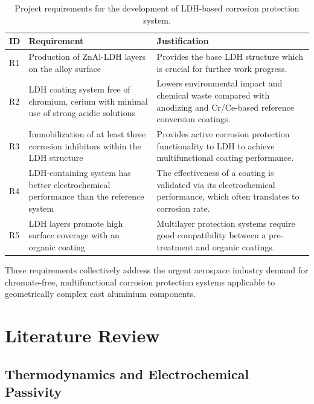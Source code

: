 \documentclass[11pt,twoside,a4paper,final]{report}
\begin{document}
\begin{table}[htbp]
    \centering
    \small
    \caption{Project requirements for the development of LDH-based corrosion protection system.}
    \label{tab:project_requirements}
    \begin{tabular}{@{} >{\raggedright\arraybackslash}p{} >{\raggedright\arraybackslash}p{} >{\raggedright\arraybackslash}p{} @{}}
        \toprule
        \textbf{ID} & \textbf{Requirement} & \textbf{Justification} \\
        \midrule
        R1 & Production of ZnAl-LDH layers on the alloy surface & Provides the base LDH structure which is crucial for further work progress. \\
        \addlinespace
        R2 & LDH coating system free of chromium, cerium with minimal use of strong acidic solutions & Lowers environmental impact and chemical waste compared with anodizing and Cr/Ce-based reference conversion coatings. \\
        \addlinespace
        R3 & Immobilization of at least three corrosion inhibitors within the LDH structure & Provides active corrosion protection functionality to LDH to achieve multifunctional coating performance. \\
        \addlinespace
        R4 & LDH-containing system has better electrochemical performance than the reference system & The effectiveness of a coating is validated via its electrochemical performance, which often translates to corrosion rate. \\
        \addlinespace
        R5 & LDH layers promote high surface coverage with an organic coating & Multilayer protection systems require good compatibility between a pre-treatment and organic coatings. \\
        \bottomrule
    \end{tabular}
\end{table}

These requirements collectively address the urgent aerospace industry demand for chromate-free, multifunctional corrosion protection systems applicable to geometrically complex cast aluminium components.


\chapter{Literature Review}

\section{Thermodynamics and Electrochemical Passivity}
\label{sec:thermo_passivity}
\end{document}
